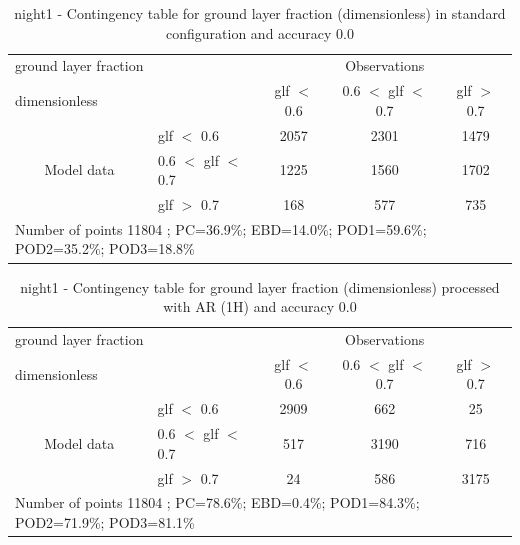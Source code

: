 \clearpage
\begin{table}[p!]
\begin{center}
\begin{tabular}{llccc}
\hline
{ground layer fraction}                                       &                                                    & \multicolumn{3}{c}{Observations}                 \\
{dimensionless}                                       &                             & glf $<$ 0.6   & 0.6 $<$ glf $<$ 0.7 & glf $>$ 0.7 \\
\hline
\multicolumn{1}{c}{\multirow{3}{*}{Model data}}  & glf $<$ 0.6             & 2057                & 2301                       & 1479              \\
                                                 & 0.6  $<$ glf $<$ 0.7 & 1225                & 1560                       & 1702              \\
                                                 & glf $>$ 0.7             & 168                & 577                       & 735              \\
\hline
\multicolumn{5}{l}{ Number of points        11804 ; PC=36.9\%; EBD=14.0\%; POD1=59.6\%; POD2=35.2\%; POD3=18.8\%}
\end{tabular}
\end{center}
\caption{night1 - Contingency table for  ground layer fraction (dimensionless) in standard configuration and accuracy 0.0}
\label{tab:contingencyglfBEF:night1}
\end{table}
\begin{table}[p!]
\begin{center}
\begin{tabular}{llccc}
\hline
{ground layer fraction}                                       &                                                    & \multicolumn{3}{c}{Observations}                 \\
{dimensionless}                                       &                             & glf $<$ 0.6   & 0.6 $<$ glf $<$ 0.7 & glf $>$ 0.7 \\
\hline
\multicolumn{1}{c}{\multirow{3}{*}{Model data}}  & glf $<$ 0.6             & 2909                & 662                       & 25              \\
                                                 & 0.6  $<$ glf $<$ 0.7 & 517                & 3190                       & 716              \\
                                                 & glf $>$ 0.7             & 24                & 586                       & 3175              \\
\hline
\multicolumn{5}{l}{ Number of points        11804 ; PC=78.6\%; EBD=0.4\%; POD1=84.3\%; POD2=71.9\%; POD3=81.1\%}
\end{tabular}
\end{center}
\caption{night1 - Contingency table for  ground layer fraction (dimensionless) processed with AR (1H) and accuracy 0.0}
\label{tab:contingencyglfAFT:night1}
\end{table}
